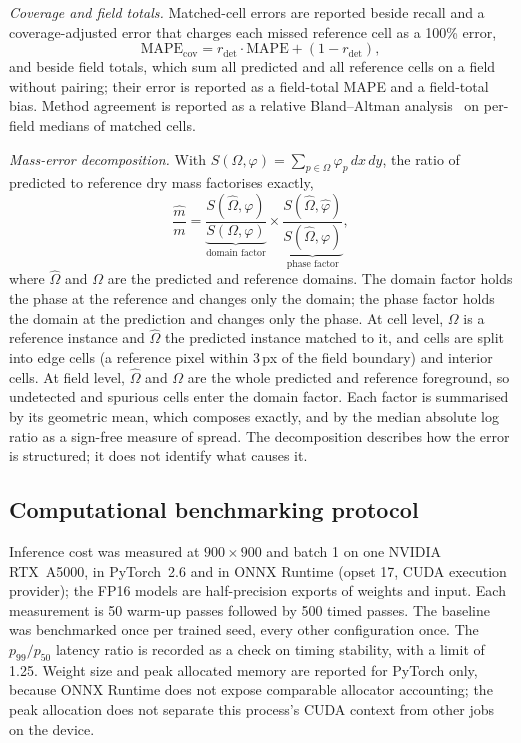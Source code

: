 \documentclass[11pt]{article}
\begin{document}
\emph{Coverage and field totals.} Matched-cell errors are reported beside
recall and a coverage-adjusted error that charges each missed reference cell as
a 100\% error,
\begin{equation}
\mathrm{MAPE}_\mathrm{cov} = r_\mathrm{det}\cdot\mathrm{MAPE} + (1-r_\mathrm{det}) ,
\label{eq:covadj}
\end{equation}
and beside field totals, which sum all predicted and all reference cells on a
field without pairing; their error is reported as a field-total MAPE and a
field-total bias. Method agreement is reported as a relative Bland--Altman
analysis~\cite{blandaltman1986} on per-field medians of matched cells.

\emph{Mass-error decomposition.} With $S(\Omega,\varphi)=\sum_{p\in\Omega}
\varphi_p\,dx\,dy$, the ratio of predicted to reference dry mass factorises
exactly,
\begin{equation}
\frac{\hat m}{m} =
\underbrace{\frac{S(\hat\Omega,\varphi)}{S(\Omega,\varphi)}}_{\text{domain factor}}
\times
\underbrace{\frac{S(\hat\Omega,\hat\varphi)}{S(\hat\Omega,\varphi)}}_{\text{phase factor}} ,
\label{eq:decomp}
\end{equation}
where $\hat\Omega$ and $\Omega$ are the predicted and reference domains. The
domain factor holds the phase at the reference and changes only the domain; the
phase factor holds the domain at the prediction and changes only the phase. At
cell level, $\Omega$ is a reference instance and $\hat\Omega$ the predicted
instance matched to it, and cells are split into edge cells (a reference pixel
within 3\,px of the field boundary) and interior cells. At field level,
$\hat\Omega$ and $\Omega$ are the whole predicted and reference foreground, so
undetected and spurious cells enter the domain factor. Each factor is
summarised by its geometric mean, which composes exactly, and by the median
absolute log ratio as a sign-free measure of spread. The decomposition
describes how the error is structured; it does not identify what causes it.

\subsection{Computational benchmarking protocol}
\label{sec:bench-protocol}

Inference cost was measured at $900\times900$ and batch 1 on one NVIDIA
RTX~A5000, in PyTorch~2.6 and in ONNX Runtime (opset 17, CUDA execution
provider); the FP16 models are half-precision exports of weights and input.
Each measurement is 50 warm-up passes followed by 500 timed passes. The
baseline was benchmarked once per trained seed, every other configuration once.
The $p_{99}/p_{50}$ latency ratio is recorded as a check on timing stability,
with a limit of 1.25. Weight size and peak allocated memory are reported for
PyTorch only, because ONNX Runtime does not expose comparable allocator
accounting; the peak allocation does not separate this process's CUDA context
from other jobs on the device.
\end{document}
